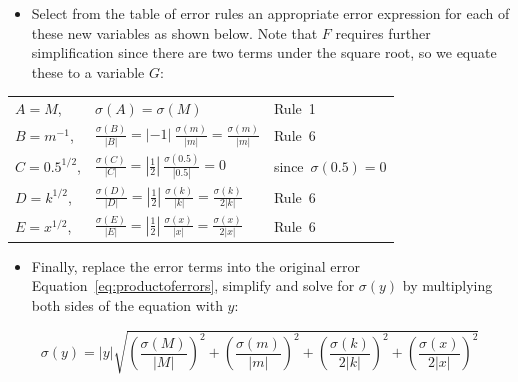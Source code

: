 \begin{itemize}
\item
Select from the table of error rules an appropriate error expression 
for each of these new variables as shown below. Note that $F$ requires further
simplification since there are two terms under the square root, so we equate these
to a variable $G$: 
\end{itemize}
\begin{center}
\begin{tabular}{lll}
 $A = M$, & $\sigma(A) = \sigma(M)$ & \mbox{Rule 1} \\ 
 $B = m^{-1}$, & $\frac{\sigma(B)}{|B|} 
    = |-1|~\frac{\sigma(m)}{|m|} = \frac{\sigma(m)}{|m|}$ & \mbox{Rule 6} \\
 $C = 0.5^{1/2}$, & $\frac{\sigma(C)}{|C|} 
    = \left|\frac{1}{2}\right|~\frac{\sigma(0.5)}{|0.5|} 
    = 0$ & \mbox{since $\sigma(0.5)=0$} \\ 
 $D = k^{1/2}$, & $\frac{\sigma(D)}{|D|} 
    = \left|\frac{1}{2}\right|~\frac{\sigma(k)}{|k|} = \frac{\sigma(k)}{2|k|}$ 
      & \mbox{Rule 6}\\
 $E = x^{1/2}$, & $\frac{\sigma(E)}{|E|} 
    = \left|\frac{1}{2}\right|~\frac{\sigma(x)}{|x|} 
    = \frac{\sigma(x)}{2|x|}$ & \mbox{Rule 6} \\
\end{tabular}
\end{center}

\begin{itemize}
\item
Finally, replace the error terms into the original error 
Equation~\ref{eq:productoferrors}, simplify and solve for $\sigma(y)$ 
by multiplying both sides of the equation with $y$:
\end{itemize}

\begin{equation}
  \sigma(y) = |y|\sqrt{\left(\frac{\sigma(M)}{|M|}\right)^2 + \left(\frac{\sigma(m)}{|m|}\right)^2 + 
  \left(\frac{\sigma(k)}{2|k|}\right)^2 + \left(\frac{\sigma(x)}{2|x|}\right)^2} 
\end{equation}







%




